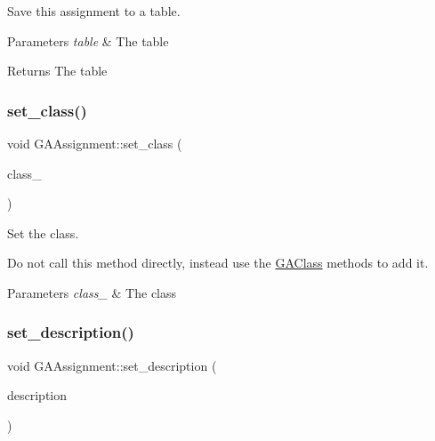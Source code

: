 Save this assignment to a table. 


\begin{DoxyParams}{Parameters}
{\em table} & The table \\
\hline
\end{DoxyParams}
\begin{DoxyReturn}{Returns}
The table 
\end{DoxyReturn}
\mbox{\label{class_g_a_assignment_a5e54b228743afce1120b6aee837b06c0}} 
\subsubsection{\texorpdfstring{set\+\_\+class()}{set\_class()}}
{\footnotesize\ttfamily void G\+A\+Assignment\+::set\+\_\+class (\begin{DoxyParamCaption}\item[{\hyperlink{class_g_a_class}{G\+A\+Class} $\ast$}]{class\+\_\+ }\end{DoxyParamCaption})}



Set the class. 

Do not call this method directly, instead use the \hyperlink{class_g_a_class}{G\+A\+Class} methods to add it.


\begin{DoxyParams}{Parameters}
{\em class\+\_\+} & The class \\
\hline
\end{DoxyParams}
\mbox{\label{class_g_a_assignment_ae1d657cde83c753067e77347141b49c4}} 
\subsubsection{\texorpdfstring{set\+\_\+description()}{set\_description()}}
{\footnotesize\ttfamily void G\+A\+Assignment\+::set\+\_\+description (\begin{DoxyParamCaption}\item[{std\+::string}]{description }\end{DoxyParamCaption})}



